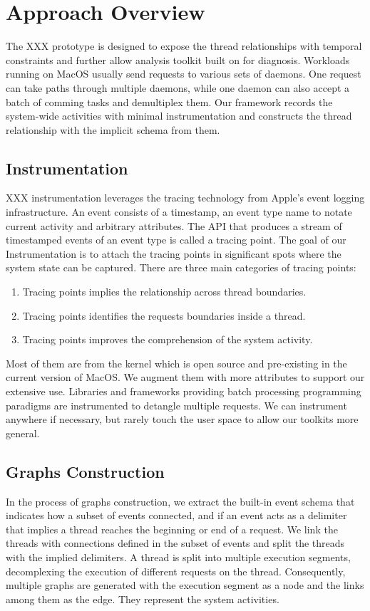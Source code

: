 \section{Approach Overview}
The XXX prototype is designed to expose the thread relationships with temporal constraints and further allow analysis toolkit built on for diagnosis.
Workloads running on MacOS usually send requests to various sets of daemons.
One request can take paths through multiple daemons, while one daemon can also accept a batch of comming tasks and demultiplex them.
Our framework records the system-wide activities with minimal instrumentation and constructs the thread relationship with the implicit schema from them.

\subsection{Instrumentation}
XXX instrumentation leverages the tracing technology from Apple's event logging infrastructure.
An event consists of a timestamp, an event type name to notate current activity and arbitrary attributes.
The API that produces a stream of timestamped events of an event type is called a tracing point.
The goal of our Instrumentation is to attach the tracing points in significant spots where the system state can be captured.
There are three main categories of tracing points:
\begin {enumerate}
	\item Tracing points implies the relationship across thread boundaries.
	\item Tracing points identifies the requests boundaries inside a thread.
	\item Tracing points improves the comprehension of the system activity.
\end{enumerate}
Most of them are from the kernel which is open source and pre-existing in the current version of MacOS.
We augment them with more attributes to support our extensive use.
Libraries and frameworks providing batch processing programming paradigms are instrumented to detangle multiple requests.
We can instrument anywhere if necessary, but rarely touch the user space to allow our toolkits more general.
\subsection{Graphs Construction}
In the process of graphs construction, we extract the built-in event schema that indicates how a subset of events connected, and if an event acts as a delimiter that implies a thread reaches the beginning or end of a request.
We link the threads with connections defined in the subset of events and split the threads with the implied delimiters.
A thread is split into multiple execution segments, decomplexing the execution of different requests on the thread.
Consequently, multiple graphs are generated with the execution segment as a node and the links among them as the edge.
They represent the system activities.

